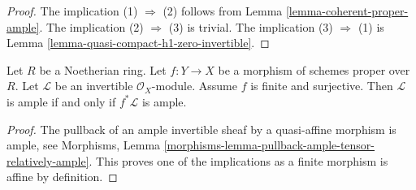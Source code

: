 \begin{proof}
The implication (1) $\Rightarrow$ (2) follows from
Lemma \ref{lemma-coherent-proper-ample}.
The implication (2) $\Rightarrow$ (3) is trivial.
The implication (3) $\Rightarrow$ (1) is
Lemma \ref{lemma-quasi-compact-h1-zero-invertible}.
\end{proof}

\begin{lemma}
\label{lemma-surjective-finite-morphism-ample}
Let $R$ be a Noetherian ring. Let $f : Y \to X$ be a morphism of
schemes proper over $R$. Let $\mathcal{L}$ be an
invertible $\mathcal{O}_X$-module. Assume $f$ is finite and surjective.
Then $\mathcal{L}$ is ample if and only if $f^*\mathcal{L}$ is ample.
\end{lemma}

\begin{proof}
The pullback of an ample invertible sheaf by a quasi-affine morphism
is ample, see Morphisms, Lemma
\ref{morphisms-lemma-pullback-ample-tensor-relatively-ample}.
This proves one of the implications as a finite morphism is affine
by definition.


\end{proof}
